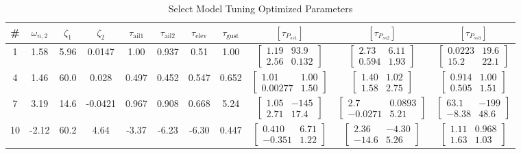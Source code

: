 \begin{landscape}
\begin{table}[H]
	\centering
	\caption{Select Model Tuning Optimized Parameters}
	\label{tab:optVar}
	\begin{tabular}{ccccccccccc}
		\hline\hline
		\# & $\omega_{n,2}$ & $\zeta_1$ & $\zeta_2$ & $\tau_\text{ail1}$ & $\tau_\text{ail2}$ & $\tau_\text{elev}$ & $\tau_\text{gust}$ &
		$\left[\tau_{P_{ss1}}\right]$ & $\left[\tau_{P_{ss2}}\right]$ & $\left[\tau_{P_{ss3}}\right]$ \\
		\hline
		1  & 1.58 & 5.96 & 0.0147 & 1.00 & 0.937 & 0.51 & 1.00 & $\begin{bmatrix}1.19 & 93.9 \\ 2.56 & 0.132\end{bmatrix}$ & $\begin{bmatrix}2.73 & 6.11 \\ 0.594 & 1.93\end{bmatrix}$ & $\begin{bmatrix}0.0223 & 19.6 \\ 15.2 & 22.1 \end{bmatrix}$ \\
		4  & 1.46 & 60.0 & 0.028 & 0.497 & 0.452 & 0.547 & 0.652 & $\begin{bmatrix}1.01 & 1.00 \\ 0.00277 & 1.50\end{bmatrix}$ & $\begin{bmatrix}1.40 & 1.02 \\ 1.58 & 2.75\end{bmatrix}$ & $\begin{bmatrix}0.914 & 1.00 \\ 0.505 & 1.51\end{bmatrix}$ \\
		7  & 3.19 & 14.6 & -0.0421 & 0.967 & 0.908 & 0.668 & 5.24 & $\begin{bmatrix}1.05 & -145 \\ 2.71 & 17.4\end{bmatrix}$ & $\begin{bmatrix}2.7 & 0.0893 \\ -0.0271 & 5.21\end{bmatrix}$ & $\begin{bmatrix}63.1 & -199 \\ -8.38 & 48.6\end{bmatrix}$ \\
		10 & -2.12 & 60.2 & 4.64 & -3.37 & -6.23 & -6.30 & 0.447 & $\begin{bmatrix}0.410 & 6.71 \\ -0.351 & 1.22\end{bmatrix}$ & $\begin{bmatrix}2.36 & -4.30 \\ -14.6 & 5.26\end{bmatrix}$ & $\begin{bmatrix}1.11 & 0.968 \\ 1.63 & 1.03\end{bmatrix}$ \\

\end{tabular}
\end{table}
\end{landscape}
